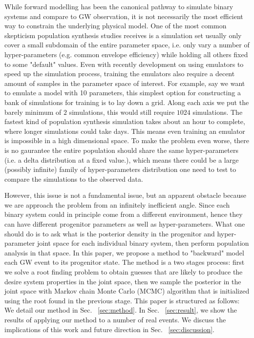 \documentclass[twocolumn]{aastex631}
\begin{document}
While forward modelling has been the canonical pathway to simulate binary systems and compare to GW observation,
it is not necessarily the most efficient way to constrain the underlying physical model.
One of the most common skepticism population synthesis studies receives is a simulation set usually only cover a small subdomain of the entire parameter space,
i.e. only vary a number of hyper-parameters (e.g. common envelope efficiency) while holding all others fixed to some "default" values.
Even with recently development on using emulators to speed up the simulation process, training the emulators also require a decent amount of samples in the parameter space of interest.
For example, say we want to emulate a model with 10 parameters, this simplest option for constructing a bank of simulations for training is to lay down a grid.
Along each axis we put the barely minimum of $2$ simulations, this would still require $1024$ simulations.
The fastest kind of population synthesis simulation takes about an hour to complete, where longer simulations could take days.
This means even training an emulator is impossible in a high dimensional space.
To make the problem even worse, there is no gaurantee the entire population should share the same hyper-parameters (i.e. a delta distribution at a fixed value.),
which means there could be a large (possibly infinite) family of hyper-parameters distribution one need to test to compare the simulations to the observed data.

However, this issue is not a fundamental issue, but an apparent obstacle because we are approach the problem from an infinitely inefficient angle.
Since each binary system could in principle come from a different environment, hence they can have different progenitor parameters as well as hyper-parameters.
What one should do is to ask what is the posterior density in the progenitor and hyper-parameter joint space for each individual binary system,
then perform population analysis in that space.
In this paper, we propose a method to "backward" model each GW event to its progenitor state.
The method is a two stages process:
first we solve a root finding problem to obtain guesses that are likely to produce the desire system properties in the joint space,
then we sample the posterior in the joint space with Markov chain Monte Carlo (MCMC) algorithm that is initialized using the root found in the previous stage.
This paper is structured as follows: We detail our method in Sec. ~\ref{sec:method}.
In Sec. ~\ref{sec:result}, we show the results of applying our method to a number of real events.
We discuss the implications of this work and future direction in Sec. ~\ref{sec:discussion}.
\end{document}
